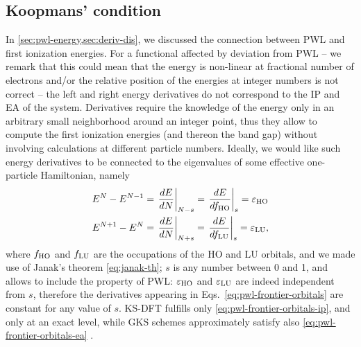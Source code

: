 \subsection{Koopmans' condition\label{sec:koopmans-condition}}
In \cref{sec:pwl-energy,sec:deriv-dis}, we discussed the connection between PWL and first ionization energies. For a functional affected by deviation from PWL -- we remark that this could mean that the energy is non-linear at fractional number of electrons and/or the relative position of the energies at integer numbers is not correct -- the left and right energy derivatives do not correspond to the IP and EA of the system. Derivatives require the knowledge of the energy only in an arbitrary small neighborhood around an integer point, thus they allow to compute the first ionization energies (and thereon the band gap) without involving calculations at different particle numbers. Ideally, we would like such energy derivatives to be connected to the eigenvalues of some effective one-particle Hamiltonian, namely
%
\begin{subequations}
    \begin{align}
        E^N - E^{N-1} &= \left. \frac{dE}{dN} \right|_{N-s} = \left. \frac{dE}{df_{\rm HO}} \right|_{s} = \varepsilon_{\rm HO} \label{eq:pwl-frontier-orbitals-ip}\\
        E^{N+1} - E^N &= \left. \frac{dE}{dN} \right|_{N+s} = \left. \frac{dE}{df_{\rm LU}} \right|_{s} = \varepsilon_{\rm LU} \label{eq:pwl-frontier-orbitals-ea},
    \end{align}
    \label{eq:pwl-frontier-orbitals}
\end{subequations}
%
where $f_{\rm HO}$ and $f_{\rm LU}$ are the occupations of the HO and LU orbitals, and we made use of Janak's theorem \eqref{eq:janak-th}; $s$ is any number between 0 and 1, and allows to include the property of PWL: $\varepsilon_{\rm HO}$ and $\varepsilon_{\rm LU}$ are indeed independent from $s$, therefore the derivatives appearing in Eqs.~\eqref{eq:pwl-frontier-orbitals} are constant for any value of $s$. KS-DFT fulfills only \cref{eq:pwl-frontier-orbitals-ip}, and only at an exact level, while GKS schemes approximately satisfy also \cref{eq:pwl-frontier-orbitals-ea} \cite{seidl_generalized_1996,cohen_fractional-charge_2008,stein_fundamental_2010}.

